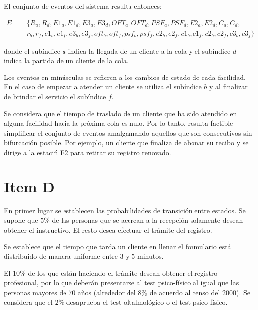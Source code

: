 \documentclass[a4paper,10pt]{article}
\begin{document}
El conjunto de eventos del sistema resulta entonces:

\begin{equation*}
\begin{split}
E = & \{R_a, R_d, E1_a, E1_d, E3_a, E3_d, OFT_a, OFT_d, PSF_a, PSF_d,
 E2_a, E2_d, C_a, C_d, \\
 & r_b, r_f, e1_b, e1_f, e3_b, e3_f, oft_b, oft_f,
 psf_b, psf_f, e2_b, e2_f, c1_b, c1_f, c2_b, c2_f, c3_b, c3_f \}
\end{split}
\end{equation*}


donde el sub\'indice $a$ indica la llegada de un cliente a la cola y el
sub\'indice $d$ indica la partida de un cliente de la cola.


Los eventos en min\'usculas se refieren a los cambios de estado de cada facilidad.
En el caso de empezar a atender un cliente se utiliza el sub\'indice $b$ y 
al finalizar de brindar el servicio el sub\'indice $f$.


Se considera que el tiempo de traslado de un cliente que ha sido atendido en
alguna facilidad hacia la pr\'oxima cola es nulo. Por lo tanto, resulta factible
simplificar el conjunto de eventos amalgamando aquellos que son
consecutivos sin bifurcaci\'{o}n posible. Por ejemplo, un cliente que finaliza
de abonar su recibo y se dirige a la estaci\'n E2 para retirar su registro
renovado.

\section*{Item D}

En primer lugar se establecen las probabilidades de transici\'on entre estados.
Se supone que $5\%$ de las personas que se acercan a la recepci\'on solamente
desean obtener el instructivo. El resto desea efectuar el tr\'amite del
registro.


Se establece que el tiempo que tarda un cliente en llenar el formulario est\'a
distribuido de manera uniforme entre $3$ y $5$ minutos.


El $10\%$ de los que est\'an haciendo el tr\'amite
desean obtener el registro profesional, por lo que deber\'an presentarse
al test psico-f\'isico al igual que las personas mayores de $70$ a\~nos
(alrededor del $8\%$ de acuerdo al censo del $2000$).
Se considera que el $2\%$ desaprueba el test oftalmol\'ogico
o el test psico-f\'isico. 
\end{document}
